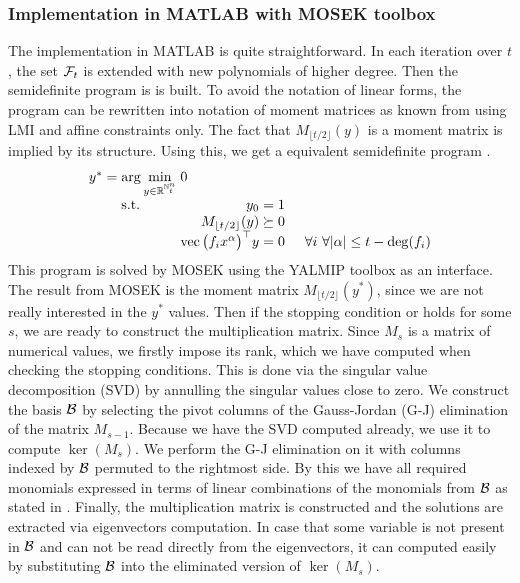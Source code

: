 \subsubsection{Implementation in MATLAB with MOSEK toolbox}
The implementation in MATLAB is quite straightforward.
In each iteration over $t$, the set $\mathcal{F}_t$ is extended with new polynomials of higher degree.
Then the semidefinite program is  is built.
To avoid the notation of linear forms, the program can be rewritten into notation of moment matrices as known from  using LMI and affine constraints only.
The fact that $M_{\lfloor t/2\rfloor}(y)$ is a moment matrix is implied by its structure.
Using this, we get a equivalent semidefinite program .
\begin{align}
  \arraycolsep=1.4pt
  \begin{array}{rclrcl@{\hskip0.5cm}l}
    y^* &=& \displaystyle \arg\min_{y\in\R^{\N^n_t}} & \multicolumn{3}{l}{0} \\
    && \text{s.t.} & y_0 &=& 1\\
    &&& M_{\lfloor t/2\rfloor}(y)&\succeq& 0\\
    &&& \vc\big(f_ix^\alpha\big)^\top y &=& 0 & \forall i\ \forall|\alpha| \leq t - \deg(f_i)
  \end{array}\labeleq{POP:sol:SDP_MM}
\end{align}
This program is solved by MOSEK \cite{mosek} using the YALMIP \cite{yalmip} toolbox as an interface.
The result from MOSEK is the moment matrix $M_{\lfloor t/2\rfloor}(y^*)$, since we are not really interested in the $y^*$ values.
Then if the stopping condition  or  holds for some $s$, we are ready to construct the multiplication matrix.
Since $M_s$ is a matrix of numerical values, we firstly impose its rank, which we have computed when checking the stopping conditions.
This is done via the singular value decomposition (SVD) by annulling the singular values close to zero.
We construct the basis $\mathcal{B}$ by selecting the pivot columns of the Gauss-Jordan (G-J) elimination of the matrix $M_{s-1}$.
Because we have the SVD computed already, we use it to compute $\ker(M_s)$.
We perform the G-J elimination on it with columns indexed by $\mathcal{B}$ permuted to the rightmost side.
By this we have all required monomials expressed in terms of linear combinations of the monomials from $\mathcal{B}$ as stated in .
Finally, the multiplication matrix is constructed and the solutions are extracted via eigenvectors computation.
In case that some variable is not present in $\mathcal{B}$ and can not be read directly from the eigenvectors, it can computed easily by substituting $\mathcal{B}$ into the eliminated version of $\ker(M_s)$.

